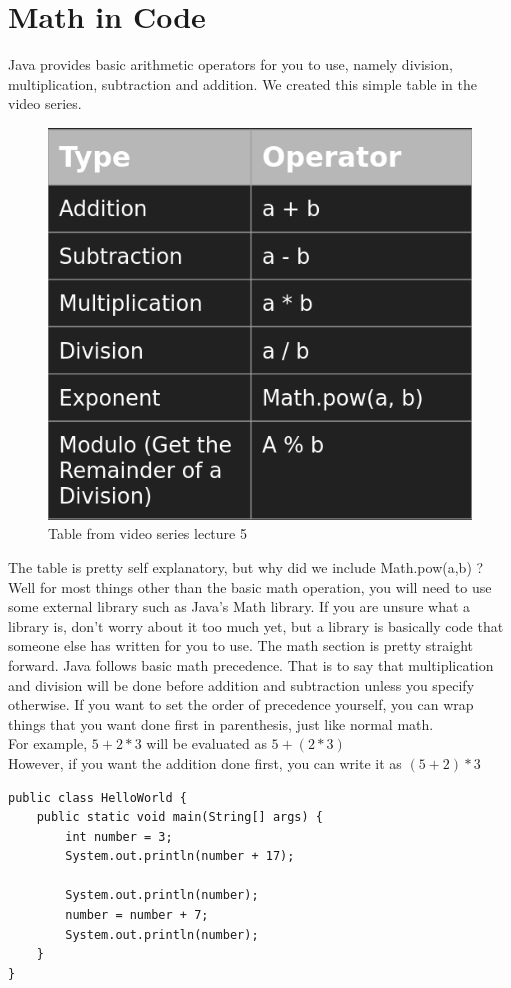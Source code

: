 \documentclass[11]{article}
\begin{document}
\section{Math in Code}
Java provides basic arithmetic operators for you to use, namely division, multiplication, subtraction and addition. We created this simple table in the video series.
\begin{figure}[H]
	\centering
	\includegraphics[scale=0.5]{math1.png}
	\caption{Table from video series lecture 5}
\end{figure}

The table is pretty self explanatory, but why did we include Math.pow(a,b) ? Well for most things other than the basic math operation, you will need to use some external library such as Java's Math library. If you are unsure what a library is, don't worry about it too much yet, but a library is basically code that someone else has written for you to use. The math section is pretty straight forward. Java follows basic math precedence. That is to say that multiplication and division will be done before addition and subtraction unless you specify otherwise. If you want to set the order of precedence yourself, you can wrap things that you want done first in parenthesis, just like normal math.\\

For example, $5 + 2 * 3$ will be evaluated as $5 + (2 * 3)$ \\
However, if you want the addition done first, you can write it as $(5 + 2) * 3$\\
\pagebreak
\begin{lstlisting}
public class HelloWorld {
    public static void main(String[] args) {
        int number = 3;
        System.out.println(number + 17);

        System.out.println(number);
        number = number + 7;
        System.out.println(number);
    }
}

\end{lstlisting}
\end{document}
